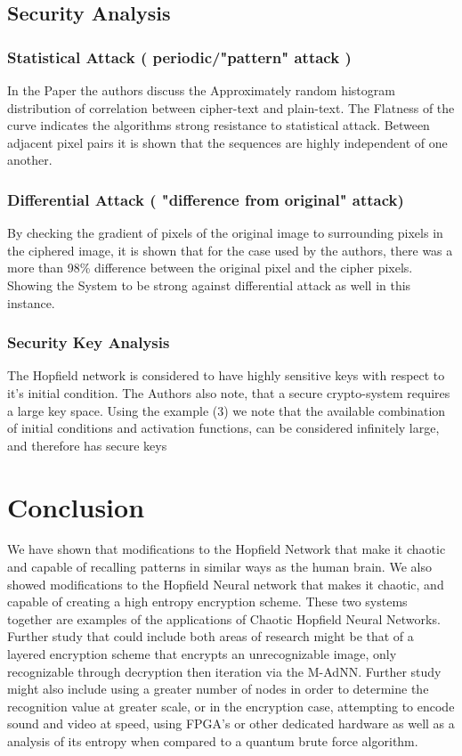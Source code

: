 \documentclass[12pt, letterpaper]{article}
\begin{document}
\subsection*{Security Analysis}
\subsubsection*{Statistical Attack ( periodic/"pattern" attack )}
In the Paper the authors discuss the Approximately random histogram distribution of correlation between cipher-text and plain-text. The Flatness of the curve indicates the algorithms strong resistance to statistical attack. Between adjacent pixel pairs it is shown that the sequences are highly independent of one another.
\subsubsection*{Differential Attack ( "difference from original" attack) }
By checking the gradient of pixels of the original image to surrounding pixels in the ciphered image, it is shown that for the case used by the authors, there was a more than 98\% difference between the original pixel and the cipher pixels. Showing the System to be strong against differential attack as well in this instance.
\subsubsection*{Security Key Analysis}
The Hopfield network is considered to have highly sensitive keys with respect to it's initial condition. The Authors also note, that a secure crypto-system requires a large key space. Using the example (3) we note that the available combination of initial conditions and activation functions,  can be considered infinitely large, and therefore has secure keys


\section*{Conclusion}

We have shown that modifications to the Hopfield Network that make it chaotic and capable of recalling patterns in similar ways as the human brain.  We also showed modifications to the Hopfield Neural network that makes it chaotic, and capable of creating a high entropy encryption scheme. These two systems together are examples of the applications of Chaotic Hopfield Neural Networks. Further study that could include both areas of research might be that of a layered encryption scheme that encrypts an unrecognizable image, only recognizable through decryption then iteration via the M-AdNN. Further study might also include using a greater number of nodes in order to determine the recognition value at greater scale, or in the encryption case, attempting to encode sound and video at speed, using FPGA's or other dedicated hardware as well as a analysis of its entropy when compared to a quantum brute force algorithm.
\end{document}

